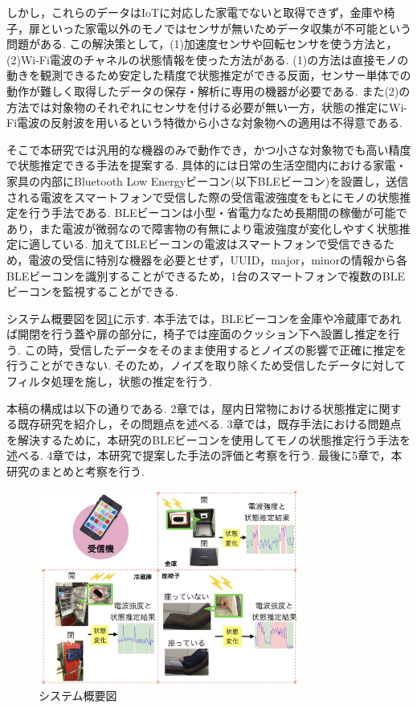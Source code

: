 \documentclass[Japanese]{dicomopapers}
\begin{document}
しかし，これらのデータはIoTに対応した家電でないと取得できず，金庫や椅子，扉といった家電以外のモノではセンサが無いためデータ収集が不可能という問題がある.
この解決策として，(1)加速度センサや回転センサを使う方法と，(2)Wi-Fi電波のチャネルの状態情報を使った方法がある.
(1)の方法は直接モノの動きを観測できるため安定した精度で状態推定ができる反面，センサー単体での動作が難しく取得したデータの保存・解析に専用の機器が必要である. %
また(2)の方法では対象物のそれぞれにセンサを付ける必要が無い一方，状態の推定にWi-Fi電波の反射波を用いるという特徴から小さな対象物への適用は不得意である.

そこで本研究では汎用的な機器のみで動作でき，かつ小さな対象物でも高い精度で状態推定できる手法を提案する.
具体的には日常の生活空間内における家電・家具の内部にBluetooth Low Energyビーコン(以下BLEビーコン)を設置し，送信される電波をスマートフォンで受信した際の受信電波強度をもとにモノの状態推定を行う手法である.
BLEビーコンは小型・省電力なため長期間の稼働が可能であり，また電波が微弱なので障害物の有無により電波強度が変化しやすく状態推定に適している.
加えてBLEビーコンの電波はスマートフォンで受信できるため，電波の受信に特別な機器を必要とせず，UUID，major，minorの情報から各BLEビーコンを識別することができるため，1台のスマートフォンで複数のBLEビーコンを監視することができる.

システム概要図を図\ref{abst}に示す.
本手法では，BLEビーコンを金庫や冷蔵庫であれば開閉を行う蓋や扉の部分に，椅子では座面のクッション下へ設置し推定を行う.
この時，受信したデータをそのまま使用するとノイズの影響で正確に推定を行うことができない.
そのため，ノイズを取り除くため受信したデータに対してフィルタ処理を施し，状態の推定を行う.

本稿の構成は以下の通りである.
2章では，屋内日常物における状態推定に関する既存研究を紹介し，その問題点を述べる.
3章では，既存手法における問題点を解決するために，本研究のBLEビーコンを使用してモノの状態推定行う手法を述べる.
4章では，本研究で提案した手法の評価と考察を行う.
最後に5章で，本研究のまとめと考察を行う.



\begin{figure}[ht]
 \centering
 \includegraphics[width=8.5cm]{abst.jpeg}
 \caption{システム概要図}
 \label{abst}
\end{figure}
\end{document}
